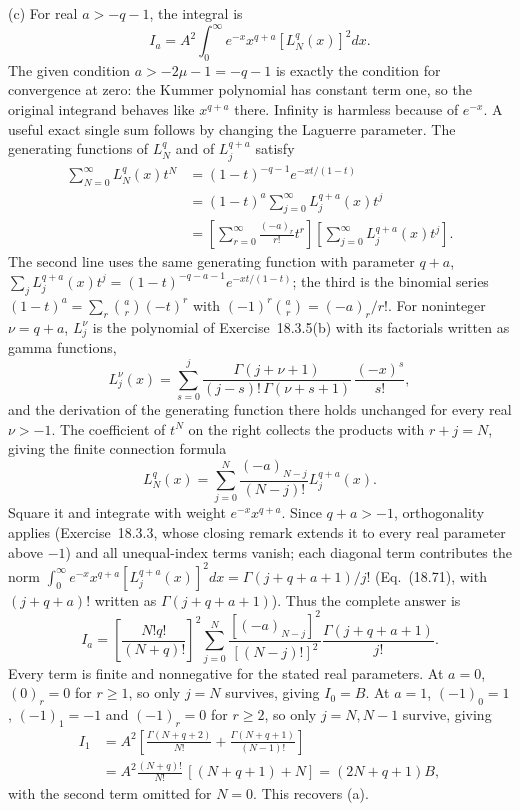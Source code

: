 (c) For real $a>-q-1$, the integral is
\[
I_a=A^2\int_0^\infty e^{-x}x^{q+a}[L_N^q(x)]^2dx.
\]
The given condition $a>-2\mu-1=-q-1$ is exactly the condition for
convergence at zero: the Kummer polynomial has constant term one, so
the original integrand behaves like $x^{q+a}$ there.  Infinity is
harmless because of $e^{-x}$.
A useful exact single sum follows by changing the Laguerre parameter.
The generating functions of $L_N^q$ and of $L_j^{q+a}$ satisfy
\begin{align*}
\sum_{N=0}^\infty L_N^q(x)t^N
 &=(1-t)^{-q-1}e^{-xt/(1-t)}\\
 &=(1-t)^a\sum_{j=0}^\infty L_j^{q+a}(x)t^j\\
 &=\left[\sum_{r=0}^\infty\frac{(-a)_r}{r!}t^r\right]
   \left[\sum_{j=0}^\infty L_j^{q+a}(x)t^j\right].
\end{align*}
The second line uses the same generating function with parameter
$q+a$, $\sum_jL_j^{q+a}(x)t^j=(1-t)^{-q-a-1}e^{-xt/(1-t)}$; the
third is the binomial series $(1-t)^a=\sum_r\binom ar(-t)^r$ with
$(-1)^r\binom ar=(-a)_r/r!$.  For noninteger $\nu=q+a$, $L_j^\nu$
is the polynomial of Exercise~18.3.5(b) with its factorials written
as gamma functions,
\[
L_j^\nu(x)=\sum_{s=0}^j
 \frac{\Gamma(j+\nu+1)}{(j-s)!\,\Gamma(\nu+s+1)}\,\frac{(-x)^s}{s!},
\]
and the derivation of the generating function there holds unchanged
for every real $\nu>-1$.  The coefficient of $t^N$ on the
right collects the products with $r+j=N$, giving the finite
connection formula
\[
L_N^q(x)=\sum_{j=0}^N
 \frac{(-a)_{N-j}}{(N-j)!}L_j^{q+a}(x).
\]
Square it and integrate with weight $e^{-x}x^{q+a}$.
Since $q+a>-1$, orthogonality applies (Exercise~18.3.3, whose
closing remark extends it to every real parameter above $-1$) and
all unequal-index terms vanish; each diagonal term contributes the norm
$\int_0^\infty e^{-x}x^{q+a}[L_j^{q+a}(x)]^2dx=\Gamma(j+q+a+1)/j!$
(Eq.~(18.71), with $(j+q+a)!$ written as $\Gamma(j+q+a+1)$).  Thus the complete answer is
\[
\boxed{I_a=\left[\frac{N!q!}{(N+q)!}\right]^2
 \sum_{j=0}^N\frac{[(-a)_{N-j}]^2}{[(N-j)!]^2}
                    \frac{\Gamma(j+q+a+1)}{j!}}.
\]
Every term is finite and nonnegative for the stated real parameters.
At $a=0$, $(0)_r=0$ for $r\ge1$, so only $j=N$ survives, giving
$I_0=B$.  At $a=1$, $(-1)_0=1$, $(-1)_1=-1$ and $(-1)_r=0$ for
$r\ge2$, so only $j=N,N-1$ survive, giving
\begin{align*}
I_1&=A^2\left[\frac{\Gamma(N+q+2)}{N!}
 +\frac{\Gamma(N+q+1)}{(N-1)!}\right]\\
 &=A^2\frac{(N+q)!}{N!}\,[(N+q+1)+N]=(2N+q+1)B,
\end{align*}
with the second term omitted for $N=0$.  This recovers (a).

